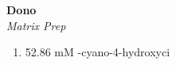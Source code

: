 \textbf{Dono} 
\\
\textit{Matrix Prep}
\begin{enumerate}
\item{52.86 mM \alpha-cyano-4-hydroxyci}
\end{enumerate}
